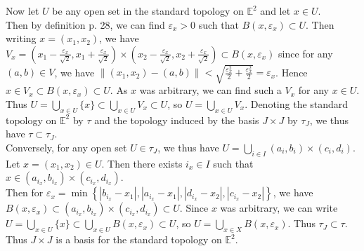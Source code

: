 \documentclass[a4paper]{article}
\begin{document}
    Now let $U$ be any open set in the standard topology on $\mathbb{E}^2$ and let $x \in U$.\\
    Then by definition p. 28, we can find $\varepsilon_x > 0$ such that
    $B(x, \varepsilon_x) \subset U$. Then writing $x = (x_1, x_2)$, we have
    $ V_x= \left( x_1- \frac{\varepsilon_x}{\sqrt{2} }, x_1
        + \frac{\varepsilon_x}{\sqrt{2} }
    \right) \times 
    \left( x_2 - \frac{\varepsilon_x}{\sqrt{2} }, x_2
    + \frac{\varepsilon_x}{\sqrt{2} } \right)
    \subset  B(x, \varepsilon_x)$ since for any
    $(a,b) \in V$, we have
    $\|(x_1, x_2) - (a,b)\| < \sqrt{\frac{\varepsilon_x^2}{2}
    + \frac{\varepsilon_x^2}{2}} = \varepsilon_x$. Hence
    $x \in V_x \subset B\left( x, \varepsilon_x \right) \subset U$. As $x$ was
    arbitrary, we can find such a $V_x$ for any $x \in U$. Thus
    $U = \bigcup_{x \in U} \{x\} \subset \bigcup_{x \in U} V_x \subset U$, so
    $U = \bigcup_{x \in U} V_x$. 
    Denoting the standard topology on $\mathbb{E}^2$ by $\tau$ and
    the topology induced by the basis $J \times J$ by $\tau_J$, we thus have
    $\tau \subset \tau_J$.\\
    \linebreak
    Conversely, for any open set $U \in \tau_J$, we thus have
    $U = \bigcup_{i \in  I} \left( a_i, b_i \right) \times (c_i,d_i)$. 
    Let $x = (x_1, x_2) \in U$. Then there exists
    $i_x \in I$ such that $x \in (a_{i_x}, b_{i_x}) \times (c_{i_x}, d_{i_x})$.\\
    Then for $\varepsilon_x = \min \left\{ 
    \left| b_{i_x} - x_1 \right| , \left| a_{i_x}- x_1 \right| ,
\left| d_{i_x} - x_2 \right| , \left| c_{i_x}- x_2 \right| \right\} $, we have
    $B(x, \varepsilon_x) \subset 
    \left( a_{i_x}, b_{i_x} \right) \times \left( c_{i_x}, d_{i_x} \right) 
    \subset U$. Since $x$ was arbitrary, we can write
    $U = \bigcup_{x \in U} \{x\} 
    \subset \bigcup_{x \in U} B\left( x, \varepsilon_x \right) \subset U$, so
    $U = \bigcup_{x \in X} B\left( x , \varepsilon_x \right) $. Thus
    $\tau_J \subset \tau$. Thus $J \times J$ is a basis for the standard
    topology on $\mathbb{E}^2$.\\
    \linebreak
\end{document}
